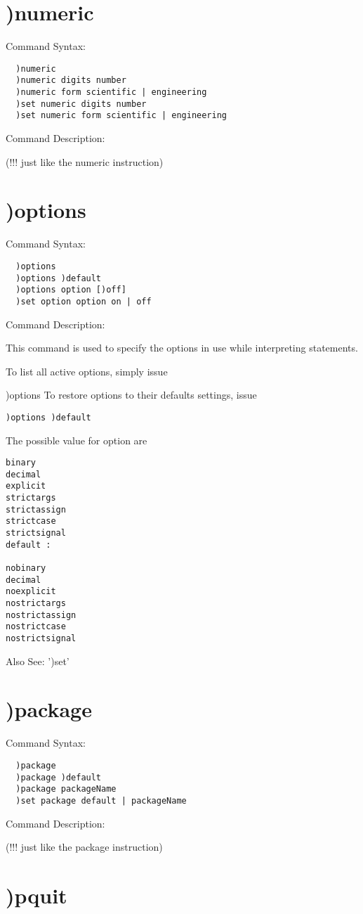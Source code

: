 \section{)numeric}

Command Syntax:
\begin{verbatim}
  )numeric
  )numeric digits number
  )numeric form scientific | engineering
  )set numeric digits number
  )set numeric form scientific | engineering
\end{verbatim}
Command Description:

(!!! just like the numeric instruction)

\section{)options}

Command Syntax:
\begin{verbatim}
  )options
  )options )default
  )options option [)off]
  )set option option on | off
\end{verbatim}
Command Description:

This command is used to specify the options in use while interpreting statements.

To list all active options, simply issue

)options
To restore options to their defaults settings, issue
\begin{verbatim}
)options )default
\end{verbatim}
The possible value for option are
\begin{verbatim}
binary
decimal
explicit
strictargs
strictassign
strictcase
strictsignal
default :

nobinary
decimal
noexplicit
nostrictargs
nostrictassign
nostrictcase
nostrictsignal
\end{verbatim}
Also See: ')set'

\section{)package}

Command Syntax:
\begin{verbatim}
  )package
  )package )default
  )package packageName
  )set package default | packageName
\end{verbatim}
Command Description:

(!!! just like the package instruction)

\section{)pquit}


